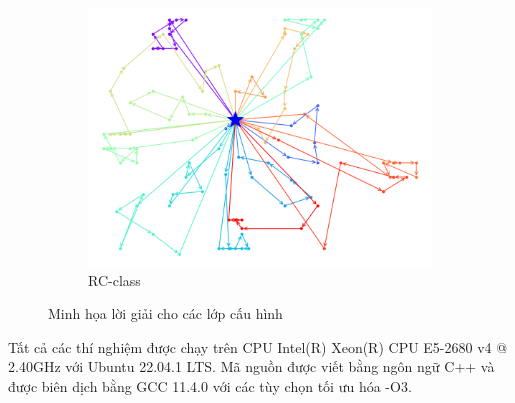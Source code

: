 \begin{figure}[H]
\begin{subfigure}{.3\textwidth}
		\includegraphics[width=1\linewidth]{figures/routes_rc101.png}
		\caption{RC-class}
		\label{fig:route_rc}
	\end{subfigure}
	\caption{Minh họa lời giải cho các lớp cấu hình}
\end{figure}

Tất cả các thí nghiệm được chạy trên CPU Intel(R) Xeon(R) CPU E5-2680 v4 @ 2.40GHz với Ubuntu 22.04.1 LTS. Mã nguồn được viết bằng ngôn ngữ C++ và được biên dịch bằng GCC 11.4.0 với các tùy chọn tối ưu hóa -O3.


